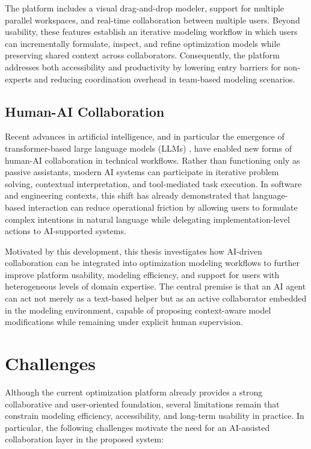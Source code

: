 The platform includes a visual drag-and-drop modeler, support for multiple parallel workspaces, and real-time collaboration between multiple users. Beyond usability, these features establish an iterative modeling workflow in which users can incrementally formulate, inspect, and refine optimization models while preserving shared context across collaborators. Consequently, the platform addresses both accessibility and productivity by lowering entry barriers for non-experts and reducing coordination overhead in team-based modeling scenarios.

\subsection{Human-AI Collaboration}
Recent advances in artificial intelligence, and in particular the emergence of transformer-based large language models (LLMs) \cite{vaswani2023attentionneed}, have enabled new forms of human-AI collaboration in technical workflows. Rather than functioning only as passive assistants, modern AI systems can participate in iterative problem solving, contextual interpretation, and tool-mediated task execution. In software and engineering contexts, this shift has already demonstrated that language-based interaction can reduce operational friction by allowing users to formulate complex intentions in natural language while delegating implementation-level actions to AI-supported systems.

Motivated by this development, this thesis investigates how AI-driven collaboration can be integrated into optimization modeling workflows to further improve platform usability, modeling efficiency, and support for users with heterogeneous levels of domain expertise. The central premise is that an AI agent can act not merely as a text-based helper but as an active collaborator embedded in the modeling environment, capable of proposing context-aware model modifications while remaining under explicit human supervision.

\section{Challenges}

Although the current optimization platform already provides a strong collaborative and user-oriented foundation, several limitations remain that constrain modeling efficiency, accessibility, and long-term usability in practice. In particular, the following challenges motivate the need for an AI-assisted collaboration layer in the proposed system:

